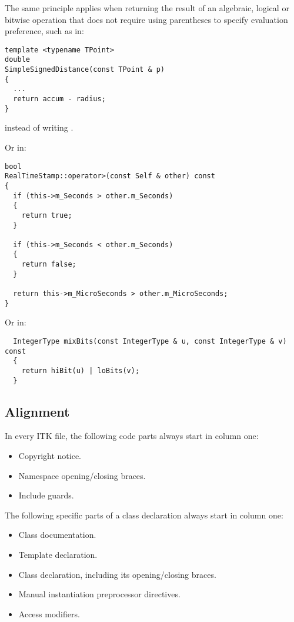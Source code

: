 The same principle applies when returning the result of an algebraic, logical or
bitwise operation that does not require using parentheses to specify
evaluation preference, such as in:

\small
\begin{verbatim}
template <typename TPoint>
double
SimpleSignedDistance(const TPoint & p)
{
  ...
  return accum - radius;
}
\end{verbatim}
\normalsize

instead of writing .

Or in:

\small
\begin{verbatim}
bool
RealTimeStamp::operator>(const Self & other) const
{
  if (this->m_Seconds > other.m_Seconds)
  {
    return true;
  }

  if (this->m_Seconds < other.m_Seconds)
  {
    return false;
  }

  return this->m_MicroSeconds > other.m_MicroSeconds;
}
\end{verbatim}
\normalsize

Or in:

\small
\begin{verbatim}
  IntegerType mixBits(const IntegerType & u, const IntegerType & v) const
  {
    return hiBit(u) | loBits(v);
  }
\end{verbatim}
\normalsize


\subsection{Alignment}
\label{subsec:Alignment}

In every ITK file, the following code parts always start in column one:
\begin{itemize}
\item Copyright notice.
\item Namespace opening/closing braces.
\item Include guards.
\end{itemize}

The following specific parts of a class declaration always start in column one:
\begin{itemize}
\item Class documentation.
\item Template declaration.
\item Class declaration, including its opening/closing braces.
\item Manual instantiation preprocessor directives.
\item Access modifiers.
\end{itemize}

